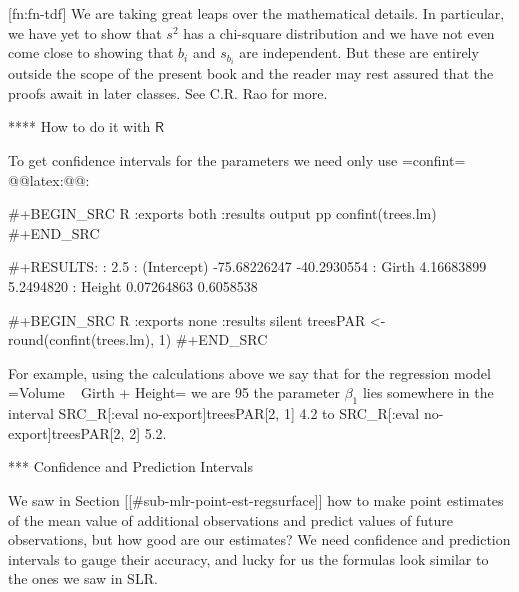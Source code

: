[fn:fn-tdf] We are taking great leaps over the mathematical
details. In particular, we have yet to show that \(s^{2}\) has a
chi-square distribution and we have not even come close to showing
that \(b_{i}\) and \(s_{b_{i}}\) are independent. But these are
entirely outside the scope of the present book and the reader may rest
assured that the proofs await in later classes. See C.R. Rao for more.

**** How to do it with \(\mathsf{R}\)

To get confidence intervals for the parameters we need only use
=confint= @@latex:@@:

#+BEGIN_SRC R :exports both :results output pp 
confint(trees.lm)
#+END_SRC

#+RESULTS:
:                    2.5 %
: (Intercept) -75.68226247 -40.2930554
: Girth         4.16683899   5.2494820
: Height        0.07264863   0.6058538

#+BEGIN_SRC R :exports none :results silent
treesPAR <- round(confint(trees.lm), 1)
#+END_SRC

For example, using the calculations above we say that for the
regression model =Volume ~ Girth + Height= we are 95%
the parameter \(\beta_{1}\) lies somewhere in the interval
SRC_R[:eval no-export]{treesPAR[2, 1]} 4.2 to SRC_R[:eval no-export]{treesPAR[2, 2]} 5.2.

*** Confidence and Prediction Intervals

We saw in Section [[#sub-mlr-point-est-regsurface]] how to make point estimates
of the mean value of additional observations and predict values of
future observations, but how good are our estimates? We need
confidence and prediction intervals to gauge their accuracy, and lucky
for us the formulas look similar to the ones we saw in SLR.

